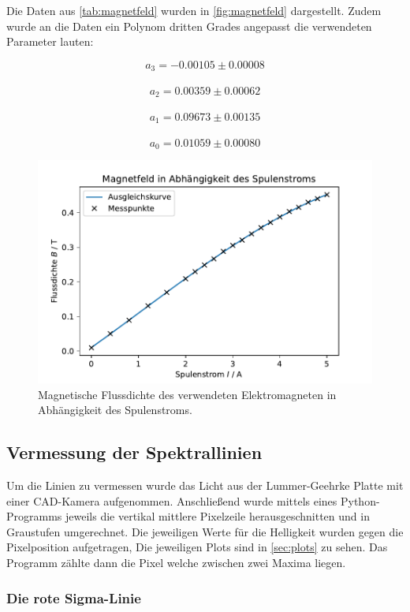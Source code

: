     Die Daten aus \autoref{tab:magnetfeld} wurden in \autoref{fig:magnetfeld} dargestellt. Zudem wurde 
    an die Daten ein Polynom dritten Grades angepasst die verwendeten Parameter lauten:
    \begin{center}
        $$a_3 = -0.00105 \pm 0.00008$$\\
        $$a_2 =  0.00359 \pm 0.00062$$\\
        $$a_1 =  0.09673 \pm 0.00135$$\\
        $$a_0 =  0.01059 \pm 0.00080$$
        
    \end{center}

    \begin{figure}
        \centering
        \includegraphics[width=1\textwidth]{content/grafiken/magnetfeld.pdf}
        \caption{Magnetische Flussdichte des verwendeten Elektromagneten in Abhängigkeit des Spulenstroms.}
        \label{fig:magnetfeld}
      \end{figure}
\subsection{Vermessung der Spektrallinien}
\label{sec:linien}
Um die Linien zu vermessen wurde das Licht aus der Lummer-Geehrke Platte mit einer CAD-Kamera
aufgenommen. Anschließend wurde mittels eines Python-Programms jeweils die  vertikal mittlere
Pixelzeile herausgeschnitten und in Graustufen umgerechnet. Die jeweiligen Werte für die Helligkeit wurden 
gegen die Pixelposition aufgetragen, Die jeweiligen Plots sind in \autoref{sec:plots} zu sehen.  Das Programm 
zählte dann die  Pixel welche zwischen zwei Maxima liegen. 
\FloatBarrier
\subsubsection{Die rote Sigma-Linie}

